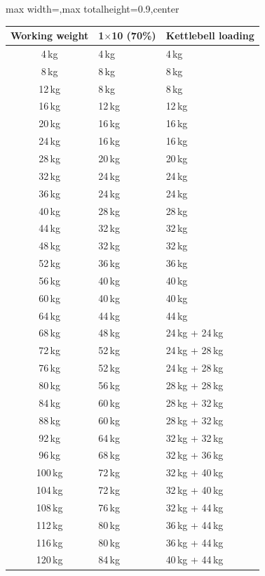 \documentclass[11pt,a4paper]{article}
\newcommand{\tablearraystretch}{1.15}
\begin{document}
\begin{center}
\renewcommand{\arraystretch}{\tablearraystretch}
\begin{adjustbox}{max width=\linewidth,max totalheight=0.9\textheight,center}
\begin{tabular}{cll}
\toprule
Working weight & 1$\times$10 (70\%) & Kettlebell loading \\
\midrule
4\,kg   & 4\,kg   & 4\,kg \\
8\,kg   & 8\,kg   & 8\,kg \\
12\,kg  & 8\,kg   & 8\,kg \\
16\,kg  & 12\,kg  & 12\,kg \\
20\,kg  & 16\,kg  & 16\,kg \\
24\,kg  & 16\,kg  & 16\,kg \\
28\,kg  & 20\,kg  & 20\,kg \\
32\,kg  & 24\,kg  & 24\,kg \\
36\,kg  & 24\,kg  & 24\,kg \\
40\,kg  & 28\,kg  & 28\,kg \\
44\,kg  & 32\,kg  & 32\,kg \\
48\,kg  & 32\,kg  & 32\,kg \\
52\,kg  & 36\,kg  & 36\,kg \\
56\,kg  & 40\,kg  & 40\,kg \\
60\,kg  & 40\,kg  & 40\,kg \\
64\,kg  & 44\,kg  & 44\,kg \\
68\,kg  & 48\,kg  & 24\,kg + 24\,kg \\
72\,kg  & 52\,kg  & 24\,kg + 28\,kg \\
76\,kg  & 52\,kg  & 24\,kg + 28\,kg \\
80\,kg  & 56\,kg  & 28\,kg + 28\,kg \\
84\,kg  & 60\,kg  & 28\,kg + 32\,kg \\
88\,kg  & 60\,kg  & 28\,kg + 32\,kg \\
92\,kg  & 64\,kg  & 32\,kg + 32\,kg \\
96\,kg  & 68\,kg  & 32\,kg + 36\,kg \\
100\,kg & 72\,kg  & 32\,kg + 40\,kg \\
104\,kg & 72\,kg  & 32\,kg + 40\,kg \\
108\,kg & 76\,kg  & 32\,kg + 44\,kg \\
112\,kg & 80\,kg  & 36\,kg + 44\,kg \\
116\,kg & 80\,kg  & 36\,kg + 44\,kg \\
120\,kg & 84\,kg  & 40\,kg + 44\,kg \\
\bottomrule
\end{tabular}
\end{adjustbox}
\renewcommand{\arraystretch}{1}
\end{center}
\end{document}
